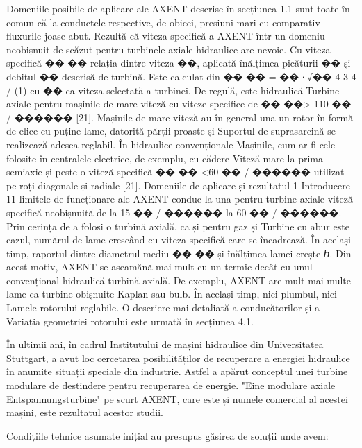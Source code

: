 Domeniile posibile de aplicare ale AXENT descrise în secțiunea 1.1 sunt toate
în comun că la conductele respective, de obicei, presiuni mari cu comparativ
fluxurile joase abut. Rezultă că viteza specifică a
AXENT într-un domeniu neobișnuit de scăzut pentru turbinele axiale hidraulice
are nevoie. Cu viteza specifică �� �� relația dintre viteza ��,
aplicată înălțimea picăturii �� și debitul �� descrisă de turbină. Este calculat
din
�� �� = �� ∙
√��
4 3 4
/
(1)
cu �� ca viteza selectată a turbinei. De regulă, este hidraulică
Turbine axiale pentru mașinile de mare viteză cu viteze specifice de �� ��>
110 �� / ������ [21]. Mașinile de mare viteză au în general una
un rotor în formă de elice cu puține lame, datorită părții proaste și
Suportul de suprasarcină se realizează adesea reglabil. În hidraulice convenționale
Mașinile, cum ar fi cele folosite în centralele electrice, de exemplu, cu cădere
Viteză mare la prima semiaxie și peste o viteză specifică �� �� <60 �� / ������
utilizat pe roți diagonale și radiale [21]. Domeniile de aplicare și rezultatul
1 Introducere
11
limitele de funcționare ale AXENT conduc la una pentru turbine axiale
viteză specifică neobișnuită de la 15 �� / ������ la 60 �� / ������.
Prin cerința de a folosi o turbină axială, ca și pentru gaz și
Turbine cu abur este cazul, numărul de lame crescând cu viteza specifică care se încadrează.
În același timp, raportul dintre diametrul mediu �� �� și înălțimea lamei crește
ℎ. Din acest motiv, AXENT se aseamănă mai mult cu un termic decât cu unul convențional
hidraulică turbină axială. De exemplu, AXENT are mult mai multe lame
ca turbine obișnuite Kaplan sau bulb. În același timp, nici plumbul, nici
Lamele rotorului reglabile. O descriere mai detaliată a conducătorilor și a
Variația geometriei rotorului este urmată în secțiunea 4.1.



În ultimii ani, în cadrul Institutului de mașini hidraulice din Universitatea Stuttgart, a avut loc cercetarea posibilităților de recuperare a energiei hidraulice în anumite situații speciale din industrie. Astfel a apărut conceptul unei turbine modulare de destindere pentru recuperarea de energie. "Eine modulare axiale Entspannungsturbine" pe scurt AXENT, care este și numele comercial al acestei mașini, este rezultatul acestor studii.

Condițiile tehnice asumate inițial au presupus găsirea de soluții unde avem:

